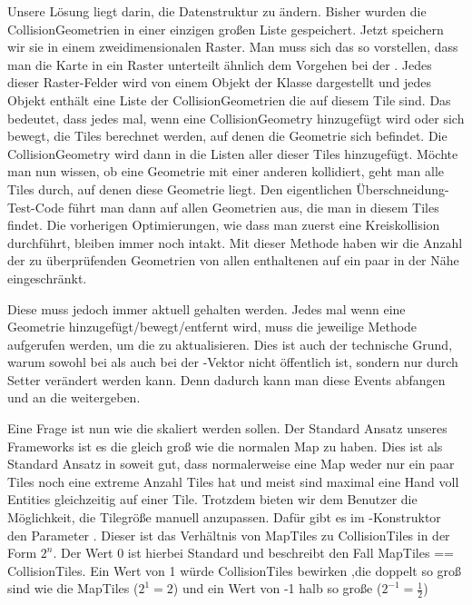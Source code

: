 Unsere Lösung liegt darin, die Datenstruktur zu ändern. Bisher wurden die CollisionGeometrien in einer einzigen großen Liste gespeichert. Jetzt speichern wir sie in einem zweidimensionalen Raster.
Man muss sich das so vorstellen, dass man die Karte in ein Raster unterteilt ähnlich dem Vorgehen bei der . Jedes dieser Raster-Felder wird von einem Objekt der Klasse  dargestellt und jedes Objekt enthält eine Liste der CollisionGeometrien die auf diesem Tile sind.
Das bedeutet, dass jedes mal, wenn eine CollisionGeometry hinzugefügt wird oder sich bewegt, die Tiles berechnet werden, auf denen die Geometrie sich befindet. Die CollisionGeometry wird dann in die Listen aller dieser Tiles hinzugefügt. Möchte man nun wissen, ob eine Geometrie mit einer anderen kollidiert, geht man alle Tiles durch, auf denen diese Geometrie liegt. Den eigentlichen Überschneidung-Test-Code führt man dann auf allen Geometrien aus, die man in diesem Tiles findet. Die vorherigen Optimierungen, wie dass man zuerst eine Kreiskollision durchführt, bleiben immer noch intakt. Mit dieser Methode haben wir die Anzahl der zu überprüfenden Geometrien von allen enthaltenen auf ein paar in der Nähe eingeschränkt.

Diese  muss jedoch immer aktuell gehalten werden. Jedes mal wenn eine Geometrie hinzugefügt/bewegt/entfernt wird, muss die jeweilige Methode aufgerufen werden, um die  zu aktualisieren. Dies ist auch der technische Grund, warum sowohl bei  als auch bei  der -Vektor nicht öffentlich ist, sondern nur durch Setter verändert werden kann. Denn dadurch kann man diese Events abfangen und an die  weitergeben.

Eine Frage ist nun wie die  skaliert werden sollen. Der Standard Ansatz unseres Frameworks ist es die  gleich groß wie die normalen Map  zu haben.
Dies ist als Standard Ansatz in soweit gut, dass normalerweise eine Map weder nur ein paar Tiles noch eine extreme Anzahl Tiles hat und meist sind maximal eine Hand voll Entities gleichzeitig auf einer Tile.
Trotzdem bieten wir dem Benutzer die Möglichkeit, die Tilegröße manuell anzupassen.
Dafür gibt es im -Konstruktor den Parameter .
Dieser ist das Verhältnis von MapTiles zu CollisionTiles in der Form $ 2^n $.
Der Wert 0 ist hierbei Standard und beschreibt den Fall MapTiles == CollisionTiles.
Ein Wert von 1 würde CollisionTiles bewirken ,die doppelt so groß sind wie die MapTiles ($2^1 = 2$) und ein Wert von -1 halb so große ($2^{-1} = \frac{1}{2}$)


